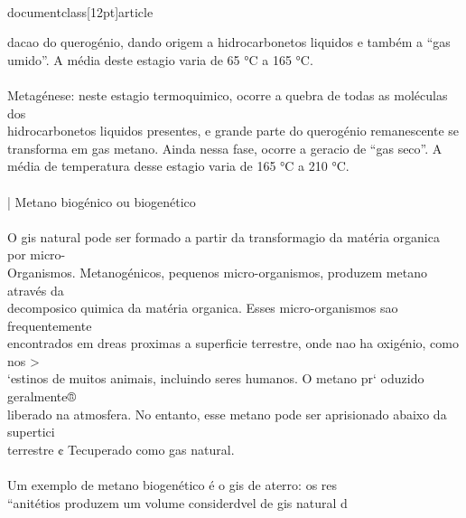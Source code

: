\\documentclass[12pt]{article}
\begin{document}
dacao do querogénio, dando origem a hidrocarbonetos liquidos e também a “gas\\
umido”. A média deste estagio varia de 65 °C a 165 °C.\\
\\
Metagénese: neste estagio termoquimico, ocorre a quebra de todas as moléculas dos\\
hidrocarbonetos liquidos presentes, e grande parte do querogénio remanescente se\\
transforma em gas metano. Ainda nessa fase, ocorre a geracio de “gas seco”. A\\
média de temperatura desse estagio varia de 165 °C a 210 °C.\\
\\
| Metano biogénico ou biogenético\\
\\
O gis natural pode ser formado a partir da transformagio da matéria organica por micro-\\
Organismos. Metanogénicos, pequenos micro-organismos, produzem metano através da\\
decomposico quimica da matéria organica. Esses micro-organismos sao frequentemente\\
encontrados em dreas proximas a superficie terrestre, onde nao ha oxigénio, como nos >\\
‘estinos de muitos animais, incluindo seres humanos. O metano pr‘ oduzido geralmente®\\
liberado na atmosfera. No entanto, esse metano pode ser aprisionado abaixo da supertici\\
terrestre ¢ Tecuperado como gas natural.\\
\\
Um exemplo de metano biogenético é o gis de aterro: os res\\
“anitétios produzem um volume considerdvel de gis natural d\\
\\
\end{document}
